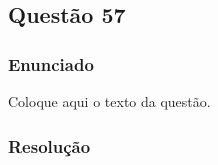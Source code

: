 \subsection{Questão 57}

\subsubsection{Enunciado}

Coloque aqui o texto da questão.

\vspace{0.5cm}

\subsubsection{Resolução}


\vspace{1cm}

